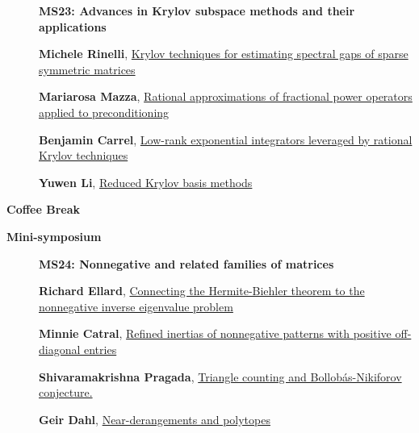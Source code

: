 \documentclass[ILAS2025-program.tex]{subfiles}
\begin{document}
\begin{description}
\begin{description}
        \end{description}
    \begin{description}
    \item[] {\color{mstitle}\textbf{MS23: Advances in Krylov subspace methods and their applications}} 
    \item[] \hypertarget{up0193}{}\textbf{Michele Rinelli}, \hyperlink{down0193}{Krylov techniques for estimating spectral gaps of sparse symmetric matrices}
        \item[] \hypertarget{up0194}{}\textbf{Mariarosa Mazza}, \hyperlink{down0194}{Rational approximations of fractional power operators applied to preconditioning}
        \item[] \hypertarget{up0195}{}\textbf{Benjamin Carrel}, \hyperlink{down0195}{Low-rank exponential integrators leveraged by rational Krylov techniques
}
        \item[] \hypertarget{up0196}{}\textbf{Yuwen Li}, \hyperlink{down0196}{Reduced Krylov basis methods}
        \end{description}
    \item[\info{15:30\textrm{--}16:00}] \textbf{Coffee Break} 
    \item[\info{16:00\textrm{--}18:00}] \textbf{Mini-symposium} 
    \begin{description}
    \item[] {\color{mstitle}\textbf{MS24: Nonnegative and related families of matrices}} 
    \item[] \hypertarget{up0197}{}\textbf{Richard Ellard}, \hyperlink{down0197}{Connecting the Hermite-Biehler theorem to the nonnegative inverse eigenvalue problem}
        \item[] \hypertarget{up0198}{}\textbf{Minnie Catral}, \hyperlink{down0198}{Refined inertias of nonnegative patterns with positive off-diagonal entries}
        \item[] \hypertarget{up0199}{}\textbf{Shivaramakrishna Pragada}, \hyperlink{down0199}{Triangle counting and Bollob\'{a}s-Nikiforov conjecture.
}
        \item[] \hypertarget{up0200}{}\textbf{Geir Dahl}, \hyperlink{down0200}{Near-derangements and polytopes}
        \end{description}

\end{description}
\end{document}
